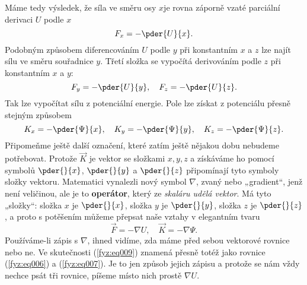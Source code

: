     Máme tedy výsledek, že síla ve směru osy \(x\)je rovna záporně vzaté parciální derivaci \(U\) 
    podle \(x\)
    \begin{equation}\label{fyz:eq006}
      F_x = -\pder{U}{x}.
    \end{equation}
    Podobným způsobem diferencováním \(U\) podle \(y\) při konstantním \(x\) a \(z\) lze najít sílu 
    ve směru souřadnice \(y\). Třetí složka se vypočítá derivováním podle \(z\) při konstantním 
    \(x\) a \(y\):
    \begin{equation}\label{fyz:eq007}
      F_y = -\pder{U}{y}, \quad  F_z = -\pder{U}{z}.
    \end{equation}
    Tak lze vypočítat sílu z potenciální energie. Pole lze získat z potenciálu přesně stejným 
    způsobem
    \begin{equation}\label{fyz:eq008}
      K_x = - \pder{\Psi}{x},\quad K_y = - \pder{\Psi}{y},\quad K_z = - \pder{\Psi}{z}.
    \end{equation}
    Připomeňme ještě další označení, které zatím ještě nějakou dobu nebudeme potřebovat. Protože 
    \(\vec{K}\) je vektor se složkami \(x, y, z\) a získáváme ho pomocí symbolů \(\pder{ }{x}\), 
    \(\pder{ }{y}\) a \(\pder{ }{z}\) připomínají tyto symboly složky vektoru. Matematici vynalezli 
    nový symbol \(\nabla\), zvaný  nebo „gradient“, jenž není veličinou, ale je to 
    \textbf{operátor}, který ze \emph{skaláru udělá vektor}. Má tyto „složky“: složka \(x\) je 
    \(\pder{ }{x}\), složka \(y\) je \(\pder{ }{y}\), složka \(z\) je \(\pder{ }{z}\), a proto s 
    potěšením můžeme přepsat naše vztahy v elegantním tvaru
    \begin{equation}\label{fyz:eq009}
      \vec{F} = -\nabla U, \quad  \vec{K} = -\nabla\Psi.
    \end{equation}
    Používáme-li zápis s \(\nabla\), ihned vidíme, zda máme před sebou vektorové rovnice nebo ne. 
    Ve skutečnosti (\ref{fyz:eq009}) znamená přesně totéž jako rovnice (\ref{fyz:eq006}) a 
    (\ref{fyz:eq007}). Je to jen způsob jejich zápisu a protože se nám vždy nechce psát tři 
    rovnice, píšeme místo nich prostě \(\nabla U\).
    
